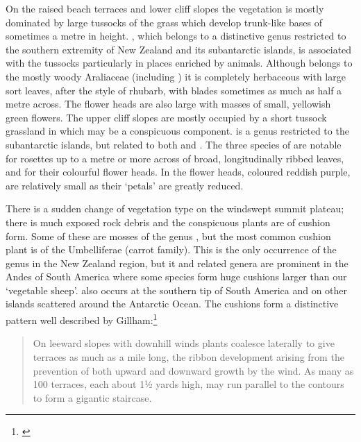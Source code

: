 On the raised beach terraces and lower cliff slopes the vegetation is mostly dominated by large tussocks of the grass  which develop trunk-like bases of sometimes a metre in height. , which belongs to a distinctive genus restricted to the southern extremity of New Zealand and its subantarctic islands, is associated with the tussocks particularly in places enriched by animals.
Although  belongs to the mostly woody Araliaceae (including ) it is completely herbaceous with large sort leaves, after the style of rhubarb, with blades sometimes as much as half a metre across.
The flower heads are also large with masses of small, yellowish green flowers.
The upper cliff slopes are mostly occupied by a short tussock grassland in which  may be a conspicuous component.  is a genus restricted to the subantarctic islands, but related to both  and .
The three species of  are notable for rosettes up to a metre or more across of broad, longitudinally ribbed leaves, and for their colourful flower heads.
In  the flower heads, coloured reddish purple, are relatively small as their `petals' are greatly reduced.

There is a sudden change of vegetation type on the windswept summit plateau; there is much exposed rock debris and the conspicuous plants are of cushion form.
Some of these are mosses of the genus , but the most common cushion plant is  of the Umbelliferae (carrot family).
This is the only occurrence of the genus in the New Zealand region, but it and related genera are prominent in the Andes of South America where some species form huge cushions larger than our `vegetable sheep'.  also occurs at the southern tip of South America and on other islands scattered around the Antarctic Ocean.
The  cushions form a distinctive pattern well described by Gillham:\footnote{\cite{gillham1967sub}}

\begin{quote}
	On leeward slopes with downhill winds  plants coalesce laterally to give terraces as much as a mile long, the ribbon development arising from the prevention of both upward and downward growth by the wind.
	As many as 100 terraces, each about 1½ yards high, may run parallel to the contours to form a gigantic staircase.
\end{quote}

